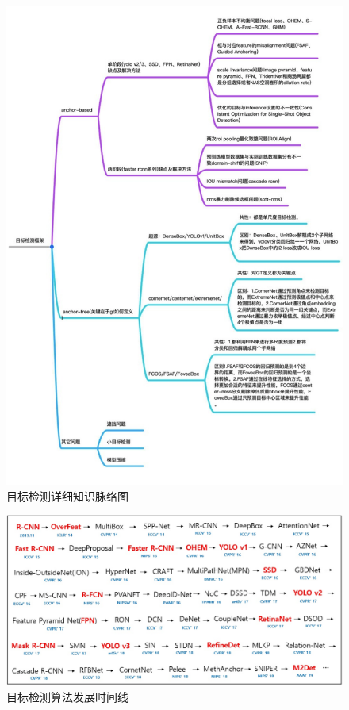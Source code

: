 \documentclass[lang=cn,11pt,a4paper]{eleganttemplate}
\begin{document}
\begin{figure}[htbp]
  \centering
  \vspace*{-3cm}
  \includegraphics[scale=0.3, angle=90]{image/cv_3.png}
  \caption{目标检测详细知识脉络图}
\end{figure}

\begin{figure}[htbp]
  \centering
  \vspace*{-4cm}
  \includegraphics[scale=0.35]{image/cv_4.jpg}
  \caption{目标检测算法发展时间线}
\end{figure}
\end{document}
